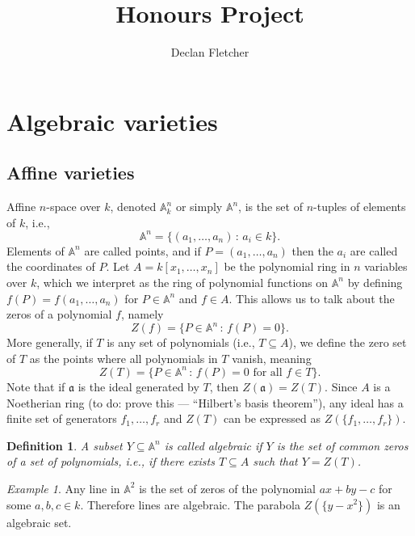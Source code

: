 \documentclass[12pt]{amsart}
\title{Honours Project}
\author{Declan Fletcher}
\date{}
\newcommand{\An}{\mathbb{A}^n}
\newtheorem{definition}[theorem]{Definition}
\theoremstyle{remark}
\theoremstyle{remark}
\newtheorem*{example}{Example}
\theoremstyle{remark}
\begin{document}
\maketitle

\tableofcontents

\section{Algebraic varieties}
\subsection{Affine varieties}
Affine $n$-space over $k$, denoted $\An_k$ or simply $\An$, is the set of $n$-tuples of elements of $k$, i.e.,
$$\An = \{(a_1, \dots, a_n) \, : \, a_i \in k\}.$$
Elements of $\An$ are called points, and if $P = (a_1, \dots, a_n)$ then the $a_i$ are called the coordinates of $P$.
Let $A = k[x_1, \dots, x_n]$ be the polynomial ring in $n$ variables over $k$, which we interpret as the ring of polynomial functions on $\An$ by defining $f(P) = f(a_1, \dots, a_n)$ for $P \in \An$ and $f \in A$.
This allows us to talk about the zeros of a polynomial $f$, namely 
$$Z(f) = \{P \in \An \, : \, f(P) = 0\}.$$
More generally, if $T$ is any set of polynomials (i.e., $T \subseteq A$), we define the zero set of $T$ as the points where all polynomials in $T$ vanish, meaning 
$$Z(T) = \{P \in \An \, : \, f(P) = 0 \text{ for all } f \in T\}.$$
Note that if $\mathfrak{a}$ is the ideal generated by $T$, then $Z(\mathfrak{a}) = Z(T)$. 
Since $A$ is a Noetherian ring (to do: prove this  --- ``Hilbert's basis theorem''), any ideal has a finite set of generators $f_1, \dots, f_r$ and $Z(T)$ can be expressed as $Z(\{f_1, \dots, f_r\})$.

\begin{definition}
A subset $Y \subseteq \An$ is called algebraic if $Y$ is the set of common zeros of a set of polynomials, i.e., if there exists $T \subseteq A$ such that $Y = Z(T)$.
\end{definition}

\begin{example}
Any line in $\mathbb{A}^2$ is the set of zeros of the polynomial $ax + by - c$ for some $a, b, c \in k$.
Therefore lines are algebraic.
The parabola $Z(\{y - x^2\})$ is an algebraic set.
\end{example}
\end{document}
